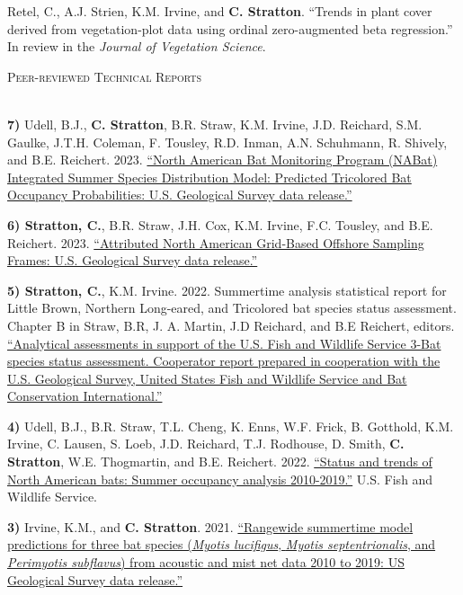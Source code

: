 \documentclass[a4paper]{article}
\newcommand{\lineunder} {
	\vspace*{-8pt} \\
	\hspace*{-18pt} \hrulefill \\
}
\newcommand{\header} [1] {
	{\hspace*{-18pt}\vspace*{6pt} \textsc{#1}}
	\vspace*{-6pt} \lineunder
}
\begin{document}
Retel, C., A.J. Strien, K.M. Irvine, and \textbf{C. Stratton}. ``Trends
in plant cover derived from vegetation-plot data using ordinal
zero-augmented beta regression.'' In review in the
\textit{Journal of Vegetation Science}. \vspace*{2mm}

\header{Peer-reviewed Technical Reports}
\vspace*{2mm}

\textbf{7)} Udell, B.J., \textbf{C. Stratton}, B.R. Straw, K.M. Irvine,
J.D. Reichard, S.M. Gaulke, J.T.H. Coleman, F. Tousley, R.D. Inman, A.N.
Schuhmann, R. Shively, and B.E. Reichert. 2023.
\href{https://doi.org/10.5066/P9MV37I7}{``North American Bat Monitoring
Program (NABat) Integrated Summer Species Distribution Model: Predicted
Tricolored Bat Occupancy Probabilities: U.S. Geological Survey data
release.''} \vspace*{2mm}

\textbf{6) Stratton, C.}, B.R. Straw, J.H. Cox, K.M. Irvine, F.C.
Tousley, and B.E. Reichert. 2023.
\href{https://doi.org/10.5066/P9H8NEOY}{``Attributed North American
Grid-Based Offshore Sampling Frames: U.S. Geological Survey data
release.''} \vspace*{2mm}

\textbf{5) Stratton, C.}, K.M. Irvine. 2022. Summertime analysis
statistical report for Little Brown, Northern Long-eared, and Tricolored
bat species status assessment. Chapter B in Straw, B.R, J. A. Martin,
J.D Reichard, and B.E Reichert, editors.
\href{https://doi.org/10.7944/P9B4RWEU}{``Analytical assessments in
support of the U.S. Fish and Wildlife Service 3-Bat species status
assessment. Cooperator report prepared in cooperation with the U.S.
Geological Survey, United States Fish and Wildlife Service and Bat
Conservation International.''} \vspace*{2mm}

\textbf{4)} Udell, B.J., B.R. Straw, T.L. Cheng, K. Enns, W.F. Frick, B.
Gotthold, K.M. Irvine, C. Lausen, S. Loeb, J.D. Reichard, T.J. Rodhouse,
D. Smith, \textbf{C. Stratton}, W.E. Thogmartin, and B.E. Reichert.
2022. \href{https://doi.org/10.5066/P92JGACB}{``Status and trends of
North American bats: Summer occupancy analysis 2010-2019.''} U.S. Fish
and Wildlife Service. \vspace*{2mm}

\textbf{3)} Irvine, K.M., and \textbf{C. Stratton}. 2021.
\href{https://doi.org/10.5066/P9XZ8D6N.}{``Rangewide summertime model
predictions for three bat species (\textit{Myotis lucifigus},
\textit{Myotis septentrionalis}, and \textit{Perimyotis subflavus}) from
acoustic and mist net data 2010 to 2019: US Geological Survey data
release.''} \vspace*{2mm}
\end{document}
